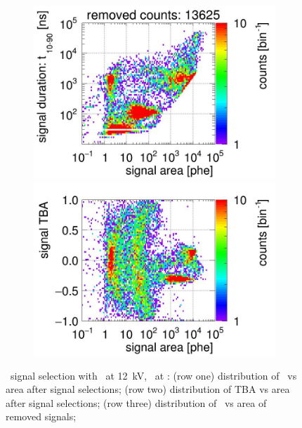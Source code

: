 \begin{landscape}
\begin{figure}[!p]
\begin{subfigure}[t]{0.32\textwidth}
			\includegraphics[width=\figurewidth,clip,trim={0 98 0 15}]{Figures/GasTest/CutsValid/res64850/pdpaX29Vecfig64850.jpg}
			\includegraphics[width=\figurewidth,clip,trim={0 8 0 40}]{Figures/GasTest/CutsValid/res64850/tbapaX29Vecfig64850.jpg}
			\caption{}
			\label{fig:signal selection dv -12 04}
		\end{subfigure}
		\caption[\gtest\ signal selection with \opdv\ at \SI{-12}{\kV}, \opgd\ at \standarddensity .]{\gtest\ signal selection with \opdv\ at \SI{12}{\kV}, \opgd\ at \standarddensity : 
			(row one) distribution of \rpdshort\ vs area after signal selections;
			(row two) distribution of TBA vs area after signal selections;
			(row three) distribution of \rpdshort\ vs area of removed signals;
}
\end{figure}
\end{landscape}
